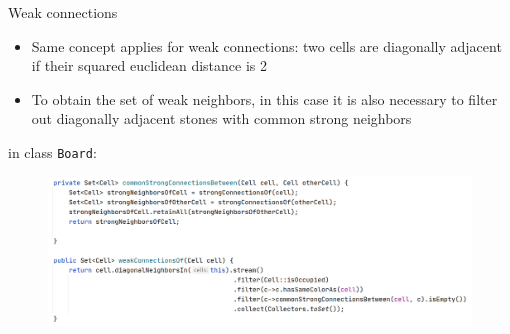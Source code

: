 \documentclass{beamer}
\begin{document}
\begin{frame}{Weak connections}

	\begin{itemize}
		\item Same concept applies for weak connections: two cells are diagonally adjacent if their squared euclidean distance is 2	
		\item To obtain the set of weak neighbors, in this case it is also necessary to filter out diagonally adjacent stones with common strong neighbors
	\end{itemize}
	in class \texttt{Board}:
\begin{figure}
	\includegraphics[scale=0.25]{images/connections-common.png}
\end{figure}

\end{frame}
\end{document}
